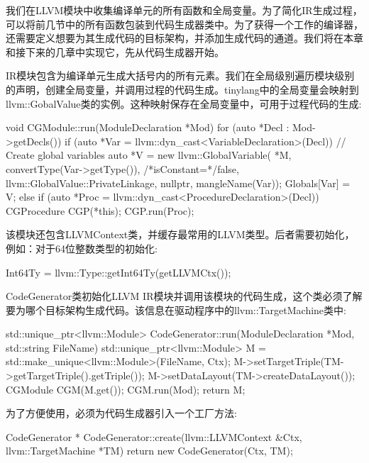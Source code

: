 
我们在LLVM模块中收集编译单元的所有函数和全局变量。为了简化IR生成过程，可以将前几节中的所有函数包装到代码生成器类中。为了获得一个工作的编译器，还需要定义想要为其生成代码的目标架构，并添加生成代码的通道。我们将在本章和接下来的几章中实现它，先从代码生成器开始。


IR模块包含为编译单元生成大括号内的所有元素。我们在全局级别遍历模块级别的声明，创建全局变量，并调用过程的代码生成。tinylang中的全局变量会映射到llvm::GobalValue类的实例。这种映射保存在全局变量中，可用于过程代码的生成:

\begin{cpp}
void CGModule::run(ModuleDeclaration *Mod) {
    for (auto *Decl : Mod->getDecls()) {
        if (auto *Var =
                llvm::dyn_cast<VariableDeclaration>(Decl)) {
            // Create global variables
            auto *V = new llvm::GlobalVariable(
                *M, convertType(Var->getType()),
                /*isConstant=*/false,
                llvm::GlobalValue::PrivateLinkage, nullptr,
                mangleName(Var));
            Globals[Var] = V;
        } else if (auto *Proc =
            llvm::dyn_cast<ProcedureDeclaration>(Decl)) {
            CGProcedure CGP(*this);
            CGP.run(Proc);
        }
    }
}
\end{cpp}

该模块还包含LLVMContext类，并缓存最常用的LLVM类型。后者需要初始化，例如：对于64位整数类型的初始化:

\begin{cpp}
Int64Ty = llvm::Type::getInt64Ty(getLLVMCtx());
\end{cpp}

CodeGenerator类初始化LLVM IR模块并调用该模块的代码生成，这个类必须了解要为哪个目标架构生成代码。该信息在驱动程序中的llvm::TargetMachine类中:

\begin{cpp}
std::unique_ptr<llvm::Module>
CodeGenerator::run(ModuleDeclaration *Mod,
                   std::string FileName) {
    std::unique_ptr<llvm::Module> M =
        std::make_unique<llvm::Module>(FileName, Ctx);
    M->setTargetTriple(TM->getTargetTriple().getTriple());
    M->setDataLayout(TM->createDataLayout());
    CGModule CGM(M.get());
    CGM.run(Mod);
    return M;
}
\end{cpp}

为了方便使用，必须为代码生成器引入一个工厂方法:

\begin{cpp}
CodeGenerator *
CodeGenerator::create(llvm::LLVMContext &Ctx,
                      llvm::TargetMachine *TM) {
    return new CodeGenerator(Ctx, TM);
}
\end{cpp}

